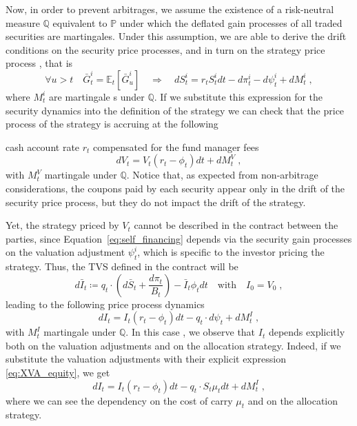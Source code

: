 \documentclass[runningheads]{m2ef}
\newcommand\soutpars[1]{\let\helpcmd\sout\parhelp#1\par\relax\relax}
\newcommand{\change}[1]{{\color{red} {#1}}}%
\newcommand{\remove}[1]{{\color{red} \soutpars{{#1}}}}%
\begin{document}
Now, in order to prevent arbitrages, we assume the existence of a risk-neutral measure $\mathbb{Q}$ equivalent to $\mathbb{P}$ under which the deflated gain processes of all traded securities are martingales. Under this assumption, we are able to derive the drift conditions on the security price processes, and in turn on the strategy price process\change{, that is}
\begin{equation}
    \forall u >t \quad \bar{G}_t^i = \mathbb{E}_t \left[\bar{G}_u^i\right] \quad\Longrightarrow \quad dS_t^i = r_tS_t^idt-d\pi_t^i-d\psi_t^i + dM_t^i \; ,
\label{eq:risk_neutral}\end{equation}
where $M_t^i$ are martingale\change{s} under $\mathbb{Q}$. If we substitute this expression for the security dynamics into the definition of the strategy we can check that the price process of the strategy is accruing at \change{the following} \remove{a} cash account rate $r_t$ compensated for the fund manager fees
\begin{equation}
    dV_t = V_t(r_t-\phi_t)dt + dM_t^V \; ,
\end{equation}
with $M_t^V$ martingale under $\mathbb{Q}$. Notice that, as expected from non-arbitrage considerations, the coupons paid by each security appear only in the drift of the security price process, but they do not impact the drift of the strategy. 

Yet, the strategy priced by $V_t$ cannot be described in the contract between the parties, since Equation~\eqref{eq:self_financing} depends via the security gain processes on the valuation adjustment $\psi_t^i$, which is specific to the investor pricing the strategy. Thus, the TVS defined in the contract will be
\begin{equation}
    d\bar{I}_t \coloneqq q_t \cdot \left(d\bar{S}_t + \frac{d\pi_t}{B_t} \right) - \bar{I}_t\phi_t dt \quad \text{with} \quad I_0 = V_0 \; , 
\label{eq:TVS_first}\end{equation}
leading to the following price process dynamics
\begin{equation}
    dI_t = I_t(r_t-\phi_t)dt -q_t\cdot d\psi_t +dM_t^I \; ,
\end{equation}
with $M_t^I$ martingale under $\mathbb{Q}$. In this case\change{,} we observe that $I_t$ depends explicitly both on the valuation adjustments and on the allocation strategy. Indeed, if we substitute the valuation adjustments with their explicit expression \eqref{eq:XVA_equity}, we get
\begin{equation}
    dI_t = I_t(r_t-\phi_t)dt - q_t \cdot S_t \mu_t dt + dM_t^I \; ,
\end{equation}
where we can see the dependency on the cost of carry $\mu_t$ and on the allocation strategy.
\end{document}
